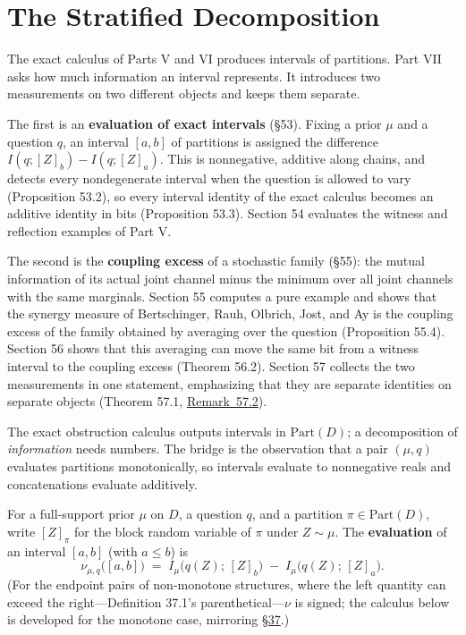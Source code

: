 \part{The Stratified Decomposition}


The exact calculus of Parts V and VI produces intervals of partitions. Part VII asks how much information an interval represents. It introduces two measurements on two different objects and keeps them separate.

The first is an \textbf{evaluation of exact intervals} (§53). Fixing a prior \(\mu\) and a question \(q\), an interval \([a,b]\) of partitions is assigned the difference \(I(q;[Z]_b) - I(q;[Z]_a)\). This is nonnegative, additive along chains, and detects every nondegenerate interval when the question is allowed to vary (Proposition 53.2), so every interval identity of the exact calculus becomes an additive identity in bits (Proposition 53.3). Section 54 evaluates the witness and reflection examples of Part V.

The second is the \textbf{coupling excess} of a stochastic family (§55): the mutual information of its actual joint channel minus the minimum over all joint channels with the same marginals. Section 55 computes a pure example and shows that the synergy measure of Bertschinger, Rauh, Olbrich, Jost, and Ay is the coupling excess of the family obtained by averaging over the question (Proposition 55.4). Section 56 shows that this averaging can move the same bit from a witness interval to the coupling excess (Theorem 56.2). Section 57 collects the two measurements in one statement, emphasizing that they are separate identities on separate objects (Theorem 57.1, \hyperlink{stmt:57.2}{Remark~57.2}).


The exact obstruction calculus outputs intervals in \(\mathrm{Part}(D)\); a decomposition of \emph{information} needs numbers. The bridge is the observation that a pair \((\mu, q)\) evaluates partitions monotonically, so intervals evaluate to nonnegative reals and concatenations evaluate additively.

\begin{thmdef}

For a full-support prior \(\mu\) on \(D\), a question \(q\), and a partition \(\pi \in \mathrm{Part}(D)\), write \([Z]_\pi\) for the block random variable of \(\pi\) under \(Z \sim \mu\). The \textbf{evaluation} of an interval \([a, b]\) (with \(a \le b\)) is
\[
\nu_{\mu,q}\big([a,b]\big) \;=\; I_\mu\big(q(Z);\, [Z]_b\big) \;-\; I_\mu\big(q(Z);\, [Z]_a\big).
\]
(For the endpoint pairs of non-monotone structures, where the left quantity can exceed the right---\hspace{0pt}Definition 37.1's parenthetical---\hspace{0pt}\(\nu\) is signed; the calculus below is developed for the monotone case, mirroring \hyperlink{sec:37}{§37}.)
\end{thmdef}

